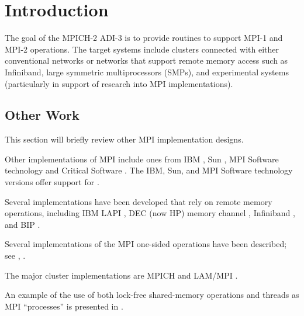 %
%

\section{Introduction}
The goal of the MPICH-2 ADI-3 is to provide routines to support MPI-1
and MPI-2 operations.  The target systems include clusters connected
with either conventional networks or networks that support remote
memory access such as Infiniband, large symmetric multiprocessors
(SMPs), and experimental systems (particularly in support of research
into MPI implementations).  

\subsection{Other Work}
\label{sec:other-work}

This section will briefly review other MPI implementation designs.

Other implementations of MPI include ones from IBM \cite{mpi-ibm},
Sun \cite{mpi-sun}, MPI Software technology \cite{mpi-softtech} and
Critical Software \cite{mpi-critical-software}.  The IBM, Sun, and MPI
Software technology versions offer support for .

Several implementations have been developed that rely on remote memory
operations, including IBM LAPI \cite{mpi-lapi}, DEC (now HP) memory
channel \cite{mpi-dec-memory-channel}, Infiniband
\cite{mpi-infiniband}, and BIP \cite{mpi-bip}.  

Several implementations of the MPI one-sided operations have been
described; see \cite{mpi-sun-rma}, \cite{mpi-fujitsu-rma}.

The major cluster implementations are MPICH \cite{mpich} and LAM/MPI
\cite{lam-mpi}.  

An example of the use of both lock-free shared-memory operations and threads
as MPI ``processes'' is presented in \cite{tang00:mpi-impl}.  

